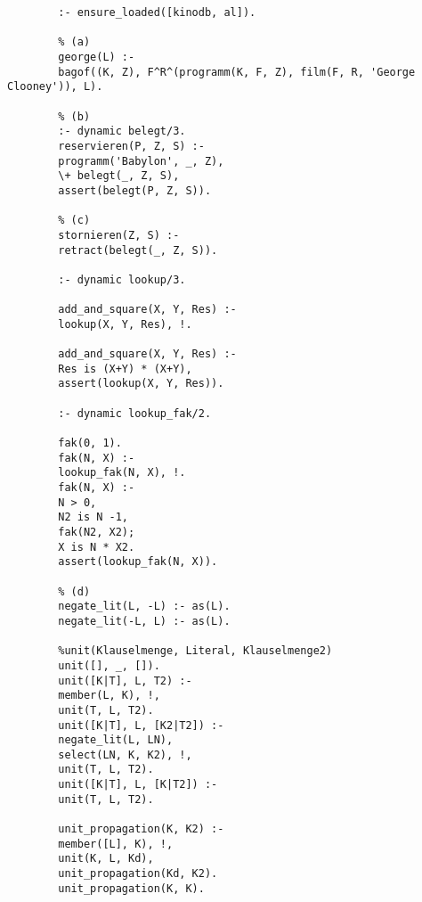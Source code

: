 \documentclass[a4paper,10pt]{article}
\begin{document}
	\begin{verbatim}
		:- ensure_loaded([kinodb, al]).
		
		% (a)
		george(L) :-
		bagof((K, Z), F^R^(programm(K, F, Z), film(F, R, 'George Clooney')), L).
		
		% (b)
		:- dynamic belegt/3.
		reservieren(P, Z, S) :-
		programm('Babylon', _, Z),
		\+ belegt(_, Z, S),
		assert(belegt(P, Z, S)).
		
		% (c)
		stornieren(Z, S) :-
		retract(belegt(_, Z, S)).
		
		:- dynamic lookup/3.
		
		add_and_square(X, Y, Res) :-
		lookup(X, Y, Res), !.
		
		add_and_square(X, Y, Res) :-
		Res is (X+Y) * (X+Y),
		assert(lookup(X, Y, Res)).
		
		:- dynamic lookup_fak/2.
		
		fak(0, 1).
		fak(N, X) :-
		lookup_fak(N, X), !.
		fak(N, X) :-
		N > 0,
		N2 is N -1,
		fak(N2, X2);
		X is N * X2.
		assert(lookup_fak(N, X)).
		
		% (d)
		negate_lit(L, -L) :- as(L).
		negate_lit(-L, L) :- as(L).
		
		%unit(Klauselmenge, Literal, Klauselmenge2)
		unit([], _, []).
		unit([K|T], L, T2) :-
		member(L, K), !,
		unit(T, L, T2).
		unit([K|T], L, [K2|T2]) :-
		negate_lit(L, LN),
		select(LN, K, K2), !,
		unit(T, L, T2).
		unit([K|T], L, [K|T2]) :-
		unit(T, L, T2).
		
		unit_propagation(K, K2) :-
		member([L], K), !,
		unit(K, L, Kd),
		unit_propagation(Kd, K2).
		unit_propagation(K, K).

	\end{verbatim}

	
	
\end{document}
